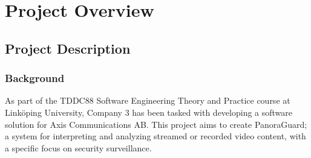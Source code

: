     
    
    
    

\chapter{Project Overview}
\section{Project Description}
    
\subsection{Background}
As part of the TDDC88 Software Engineering Theory and Practice course at Linköping University, Company 3 has been tasked with developing a software solution for Axis Communications AB. This project aims to create PanoraGuard; a system for interpreting and analyzing streamed or recorded video content, with a specific focus on security surveillance.
    
